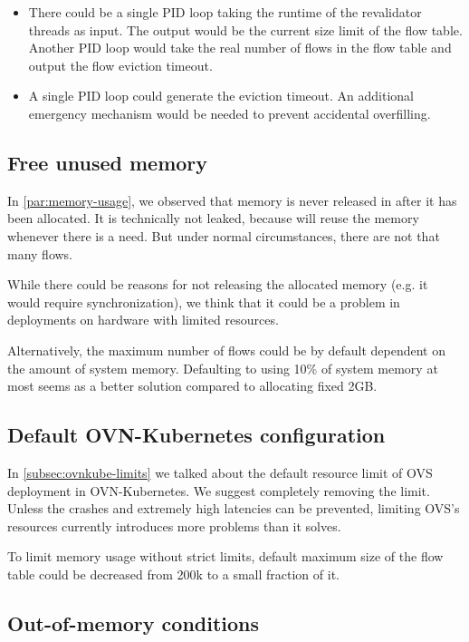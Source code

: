 \begin{itemize}
    \item There could be a single PID loop taking the runtime of the revalidator threads as input. The output would be the current size limit of the flow table. Another PID loop would take the real number of flows in the flow table and output the flow eviction timeout.

    \item A single PID loop could generate the eviction timeout. An additional emergency mechanism would be needed to prevent accidental overfilling.
\end{itemize}

\subsection{Free unused memory}

In \cref{par:memory-usage}, we observed that memory is never released in  after it has been allocated. It is technically not leaked, because  will reuse the memory whenever there is a need. But under normal circumstances, there are not that many flows. 

While there could be reasons for not releasing the allocated memory (e.g. it would require synchronization), we think that it could be a problem in deployments on hardware with limited resources.

Alternatively, the maximum number of flows could be by default dependent on the amount of system memory. Defaulting to using 10\% of system memory at most seems as a better solution compared to allocating fixed 2GB.


\subsection{Default OVN-Kubernetes configuration}

In \cref{subsec:ovnkube-limits} we talked about the default resource limit of OVS deployment in OVN-Kubernetes. We suggest completely removing the limit. Unless the crashes and extremely high latencies can be prevented, limiting OVS's resources currently introduces more problems than it solves.

To limit memory usage without strict limits, default maximum size of the flow table could be decreased from 200k to a small fraction of it.


\subsection{Out-of-memory conditions}

